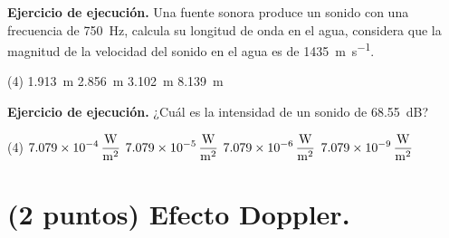 \documentclass[12pt]{exam}
\begin{document}
\begin{questions}
    \question \label{Ejercicio_02} \textbf{Ejercicio de ejecución.} Una fuente sonora produce un sonido con una frecuencia de \SI{750}{\hertz}, calcula su longitud de onda en el agua, considera que la magnitud de la velocidad del sonido en el agua es de \SI{1435}{\meter\per\second}.
    \begin{tasks}(4)
        \task \SI{1.913}{\meter}
        \task \SI{2.856}{\meter}
        \task \SI{3.102}{\meter}
        \task \SI{8.139}{\meter}
   \end{tasks}
   \question \label{Ejercicio_03} \textbf{Ejercicio de ejecución.} ¿Cuál es la intensidad de un sonido de \SI{68.55}{\dB}?
   \begin{tasks}(4)
    \task $\displaystyle \SI[per-mode=fraction]{7.079d-4}{\watt\per\square\meter}$
    \task $\displaystyle \SI[per-mode=fraction]{7.079d-5}{\watt\per\square\meter}$
    \task $\displaystyle \SI[per-mode=fraction]{7.079d-6}{\watt\per\square\meter}$
    \task $\displaystyle \SI[per-mode=fraction]{7.079d-9}{\watt\per\square\meter}$
   \end{tasks}

   \section{(2 puntos) Efecto Doppler.}


\end{questions}
\end{document}
